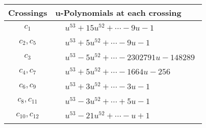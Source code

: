 \documentclass[1p]{elsarticle_modified}
\theoremstyle{definition}
\begin{document}
\begin{tabular}{m{50pt}|m{274pt}}
Crossings & \hspace{64pt}u-Polynomials at each crossing \\
\hline $$\begin{aligned}c_{1}\end{aligned}$$&$\begin{aligned}
&u^{53}+15 u^{52}+\cdots-9 u-1
\end{aligned}$\\
\hline $$\begin{aligned}c_{2},c_{5}\end{aligned}$$&$\begin{aligned}
&u^{53}+5 u^{52}+\cdots-9 u-1
\end{aligned}$\\
\hline $$\begin{aligned}c_{3}\end{aligned}$$&$\begin{aligned}
&u^{53}-5 u^{52}+\cdots-2302791 u-148289
\end{aligned}$\\
\hline $$\begin{aligned}c_{4},c_{7}\end{aligned}$$&$\begin{aligned}
&u^{53}+5 u^{52}+\cdots-1664 u-256
\end{aligned}$\\
\hline $$\begin{aligned}c_{6},c_{9}\end{aligned}$$&$\begin{aligned}
&u^{53}+3 u^{52}+\cdots-3 u-1
\end{aligned}$\\
\hline $$\begin{aligned}c_{8},c_{11}\end{aligned}$$&$\begin{aligned}
&u^{53}-3 u^{52}+\cdots+5 u-1
\end{aligned}$\\
\hline $$\begin{aligned}c_{10},c_{12}\end{aligned}$$&$\begin{aligned}
&u^{53}-21 u^{52}+\cdots- u+1
\end{aligned}$\\
\hline
\end{tabular}\\~\\
\newpage\renewcommand{\arraystretch}{1}
\end{document}
